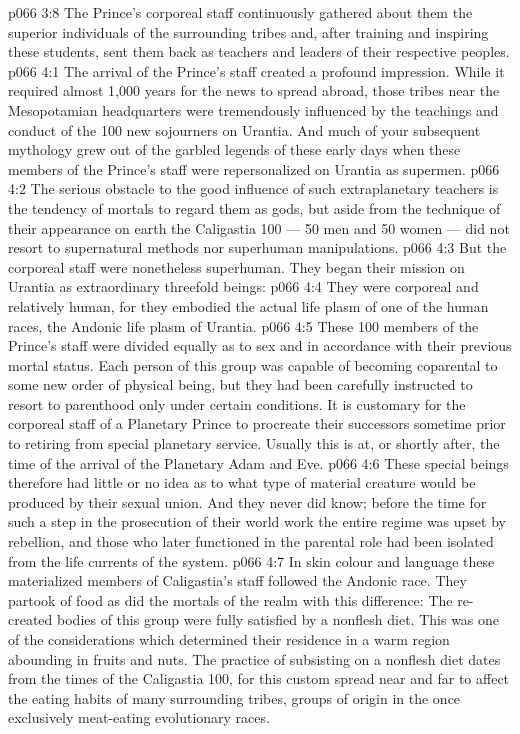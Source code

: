 \vs p066 3:8 The Prince’s corporeal staff continuously gathered about them the superior individuals of the surrounding tribes and, after training and inspiring these students, sent them back as teachers and leaders of their respective peoples.
\vs p066 4:1 The arrival of the Prince’s staff created a profound impression. While it required almost 1,000 years for the news to spread abroad, those tribes near the Mesopotamian headquarters were tremendously influenced by the teachings and conduct of the 100 new sojourners on Urantia. And much of your subsequent mythology grew out of the garbled legends of these early days when these members of the Prince’s staff were repersonalized on Urantia as supermen.
\vs p066 4:2 The serious obstacle to the good influence of such extraplanetary teachers is the tendency of mortals to regard them as gods, but aside from the technique of their appearance on earth the Caligastia 100 --- 50 men and 50 women --- did not resort to supernatural methods nor superhuman manipulations.
\vs p066 4:3 But the corporeal staff were nonetheless superhuman. They began their mission on Urantia as extraordinary threefold beings:
\vs p066 4:4 \bibnobreakspace They were corporeal and relatively human, for they embodied the actual life plasm of one of the human races, the Andonic life plasm of Urantia.
\vs p066 4:5 These 100 members of the Prince’s staff were divided equally as to sex and in accordance with their previous mortal status. Each person of this group was capable of becoming coparental to some new order of physical being, but they had been carefully instructed to resort to parenthood only under certain conditions. It is customary for the corporeal staff of a Planetary Prince to procreate their successors sometime prior to retiring from special planetary service. Usually this is at, or shortly after, the time of the arrival of the Planetary Adam and Eve.
\vs p066 4:6 These special beings therefore had little or no idea as to what type of material creature would be produced by their sexual union. And they never did know; before the time for such a step in the prosecution of their world work the entire regime was upset by rebellion, and those who later functioned in the parental role had been isolated from the life currents of the system.
\vs p066 4:7 In skin colour and language these materialized members of Caligastia’s staff followed the Andonic race. They partook of food as did the mortals of the realm with this difference: The re\hyp{}created bodies of this group were fully satisfied by a nonflesh diet. This was one of the considerations which determined their residence in a warm region abounding in fruits and nuts. The practice of subsisting on a nonflesh diet dates from the times of the Caligastia 100, for this custom spread near and far to affect the eating habits of many surrounding tribes, groups of origin in the once exclusively meat\hyp{}eating evolutionary races.
